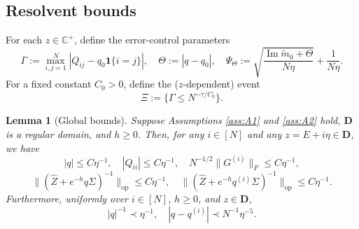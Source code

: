 \documentclass[11pt,reqno]{amsart}
\def\C{\mathbb{C}}
\def\1{\mathbf{1}}
\def\bD{\mathbf{D}}
\def\Im{\operatorname{Im}}
\def\op{\mathrm{op}}
\newtheorem{lemma}[theorem]{Lemma}
\theoremstyle{definition}
\numberwithin{equation}{section}
\numberwithin{figure}{section}
\begin{document}
\subsection{Resolvent bounds}
For each $z\in\C^+$, define the error-control parameters
\[
    \Gamma:=\max_{i,j=1}^N|Q_{ij}-q_0\1\{i=j\}|,\quad \Theta:=|q-q_0|,\quad \Psi_\Theta:=\sqrt{\frac{\Im\widetilde m_0+\Theta}{N\eta}}+\frac{1}{N\eta}.
\]
For a fixed constant $C_0>0$, define the ($z$-dependent) event
\[
    \Xi:=\{\Gamma\leq N^{-\tau/C_0}\}.
\]

\begin{lemma}[Global bounds]\label{lem:global-bounds}
Suppose Assumptions \ref{ass:A1} and \ref{ass:A2} hold, $\bD$ is a regular domain, and $h\geq 0$. Then, for any $i\in[N]$ and any $z=E+i\eta\in\bD$, we have
\[
    |q|\leq C\eta^{-1},\quad |Q_{ii}|\leq C\eta^{-1},\quad N^{-1/2}\|G^{(i)}\|_F\leq C\eta^{-1},
\]
\[
    \|(\hat Z+e^{-h}q\Sigma)^{-1}\|_\op\leq C\eta^{-1},\quad \|(\hat Z+e^{-h}q^{(i)}\Sigma)^{-1}\|_\op\leq C\eta^{-1}.
\]
Furthermore, uniformly over $i\in[N]$, $h\geq 0$, and $z\in\bD$,
\[
    |q|^{-1}\prec\eta^{-1},\quad |q-q^{(i)}|\prec N^{-1}\eta^{-5}.
\]
\end{lemma}
\end{document}
